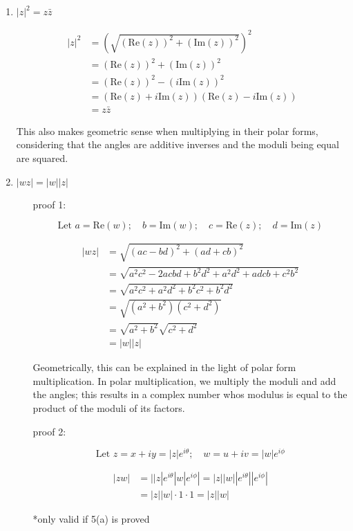 \documentclass{book}
\begin{document}
\begin{enumerate}[label=\arabic*)]
\begin{enumerate}[label=(\alph*)]
\item $|z|^2=z\bar{z}$

\begin{align*}
|z|^2&=(\sqrt{(\mbox{Re}(z))^2+(\mbox{Im}(z))^2})^2\\
&=(\mbox{Re}(z))^2+(\mbox{Im}(z))^2\\
&=(\mbox{Re}(z))^2-(i\mbox{Im}(z))^2\\
&=(\mbox{Re}(z)+i\mbox{Im}(z))(\mbox{Re}(z)-i\mbox{Im}(z))\\
&=z\bar{z}
\end{align*}

This also makes geometric sense when multiplying in their polar forms, considering that the angles are additive inverses and the moduli being equal are squared.

\item $|wz|=|w||z|$

\begin{enumerate}

\item[proof 1:]

\[\mbox{Let }a=\mbox{Re}(w);\quad b=\mbox{Im}(w);\quad c=\mbox{Re}(z);\quad d=\mbox{Im}(z)\]

\begin{align*}
|wz|&=\sqrt{(ac-bd)^2+(ad+cb)^2}\\
&=\sqrt{a^2c^2-2acbd+b^2d^2+a^2d^2+adcb+c^2b^2}\\
&=\sqrt{a^2c^2+a^2d^2+b^2c^2+b^2d^2}\\
&=\sqrt{(a^2+b^2)(c^2+d^2)}\\
&=\sqrt{a^2+b^2}\sqrt{c^2+d^2}\\
&=|w||z|
\end{align*}

Geometrically, this can be explained in the light of polar form multiplication. In polar multiplication, we multiply the moduli and add the angles; this results in a complex number whos modulus is equal to the product of the moduli of its factors.

\item[proof 2:]

\[\mbox{Let }z=x+iy=|z|e^{i\theta};\quad w=u+iv=|w|e^{i\phi}\]

\begin{align*}
|zw|&=||z|e^{i\theta}|w|e^{i\phi}|=|z||w||e^{i\theta}||e^{i\phi}|\\
&=|z||w|\cdot1\cdot1=|z||w|
\end{align*}

\color{red}*only valid if 5(a) is proved\color{black}


\end{enumerate}
\end{enumerate}
\end{enumerate}
\end{document}
